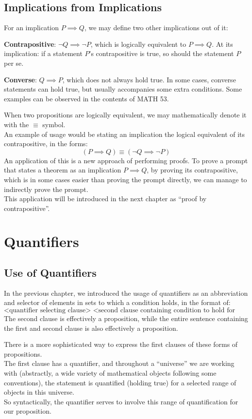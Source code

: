 \subsection{Implications from Implications}
For an implication $P \implies Q$, we may define two other implications out of it:
\begin{bindenum}
    \item \textbf{Contrapositive}: $\neg Q \implies \neg P$, which is logically equivalent to $P \implies Q$. At its implication: if a statement $P$'s contrapositive is true, so should the statement $P$ per se.
    \item \textbf{Converse}: $Q \implies P$, which does not always hold true. In some cases, converse statements can hold true, but usually accompanies some extra conditions. Some examples can be observed in the contents of MATH 53.
\end{bindenum}

When two propositions are logically equivalent, we may mathematically denote it with the $\equiv$ symbol. \\
An example of usage would be stating an implication the logical equivalent of its contrapositive, in the forms:
\[(P \implies Q) \equiv (\neg Q \implies \neg P)\]
An application of this is a new approach of performing proofs. To prove a prompt that states a theorem as an implication $P \implies Q$, by proving its contrapositive, which is in some cases easier than proving the prompt directly, we can manage to indirectly prove the prompt. \\
This application will be introduced in the next chapter as ``proof by contrapositive''.

\section{Quantifiers}

\subsection{Use of Quantifiers}
In the previous chapter, we introduced the usage of quantifiers as an abbreviation and selector of elements in sets to which a condition holds, in the format of:
\[\text{<quantifier selecting clause> <second clause containing condition to hold for selected values>}\]
The second clause is effectively a proposition, while the entire sentence containing the first and second clause is also effectively a proposition.

There is a more sophisticated way to express the first clauses of these forms of propositions. \\
The first clause has a quantifier, and throughout a ``universe'' we are working with (abstractly, a wide variety of mathematical objects following some conventions), the statement is quantified (holding true) for a selected range of objects in this universe. \\
So syntactically, the quantifier serves to involve this range of quantification for our proposition.

